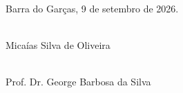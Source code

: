 \documentclass[11pt,a4paper]{article}
\begin{document}
 

\vspace{3em}

\noindent Barra do Garças, 9 de setembro de 2026.

\vspace{8em}

\noindent
\begin{minipage}[t]{0.45\textwidth}
\centering
\hrulefill\\
Micaías Silva de Oliveira
\end{minipage}
\hfill
\begin{minipage}[t]{0.45\textwidth}
\centering
\hrulefill\\
Prof. Dr. George Barbosa da Silva
\end{minipage}
\end{document}
